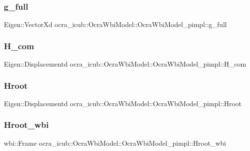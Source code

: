 \subsubsection{\texorpdfstring{g\+\_\+full}{g\_full}}
{\footnotesize\ttfamily Eigen\+::\+Vector\+Xd ocra\+\_\+icub\+::\+Ocra\+Wbi\+Model\+::\+Ocra\+Wbi\+Model\+\_\+pimpl\+::g\+\_\+full}

\hypertarget{structOcraWbiModel_1_1OcraWbiModel__pimpl_a5e031088136b048a403c9df06e62c2b8}{}\label{structOcraWbiModel_1_1OcraWbiModel__pimpl_a5e031088136b048a403c9df06e62c2b8} 
\subsubsection{\texorpdfstring{H\+\_\+com}{H\_com}}
{\footnotesize\ttfamily Eigen\+::\+Displacementd ocra\+\_\+icub\+::\+Ocra\+Wbi\+Model\+::\+Ocra\+Wbi\+Model\+\_\+pimpl\+::\+H\+\_\+com}

\hypertarget{structOcraWbiModel_1_1OcraWbiModel__pimpl_a123381dc5b78bd79aed493801e3e6b35}{}\label{structOcraWbiModel_1_1OcraWbiModel__pimpl_a123381dc5b78bd79aed493801e3e6b35} 
\subsubsection{\texorpdfstring{Hroot}{Hroot}}
{\footnotesize\ttfamily Eigen\+::\+Displacementd ocra\+\_\+icub\+::\+Ocra\+Wbi\+Model\+::\+Ocra\+Wbi\+Model\+\_\+pimpl\+::\+Hroot}

\hypertarget{structOcraWbiModel_1_1OcraWbiModel__pimpl_a633b61e128305d5437d8e8c61ae63849}{}\label{structOcraWbiModel_1_1OcraWbiModel__pimpl_a633b61e128305d5437d8e8c61ae63849} 
\subsubsection{\texorpdfstring{Hroot\+\_\+wbi}{Hroot\_wbi}}
{\footnotesize\ttfamily wbi\+::\+Frame ocra\+\_\+icub\+::\+Ocra\+Wbi\+Model\+::\+Ocra\+Wbi\+Model\+\_\+pimpl\+::\+Hroot\+\_\+wbi}

